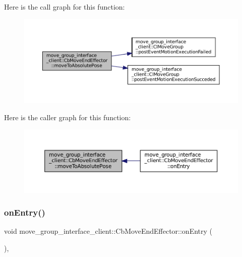 Here is the call graph for this function\+:
\nopagebreak
\begin{figure}[H]
\begin{center}
\leavevmode
\includegraphics[width=350pt]{classmove__group__interface__client_1_1CbMoveEndEffector_a7850f5f9c6fbc040b77e8456a2ecee09_cgraph}
\end{center}
\end{figure}
Here is the caller graph for this function\+:
\nopagebreak
\begin{figure}[H]
\begin{center}
\leavevmode
\includegraphics[width=350pt]{classmove__group__interface__client_1_1CbMoveEndEffector_a7850f5f9c6fbc040b77e8456a2ecee09_icgraph}
\end{center}
\end{figure}
\mbox{\label{classmove__group__interface__client_1_1CbMoveEndEffector_acd7f50c949fcf6e7c56b285439b0b1de}} 
\subsubsection{\texorpdfstring{on\+Entry()}{onEntry()}}
{\footnotesize\ttfamily void move\+\_\+group\+\_\+interface\+\_\+client\+::\+Cb\+Move\+End\+Effector\+::on\+Entry (\begin{DoxyParamCaption}{ }\end{DoxyParamCaption})\hspace{0.3cm}{\ttfamily [override]}, {\ttfamily [virtual]}}



